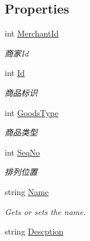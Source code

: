 \subsection*{Properties}
\begin{DoxyCompactItemize}
\item 
int \mbox{\hyperlink{class_t_net_1_1_com_1_1_model_1_1_goods_data_a4df1b04b7bb1e2ab0916e0ff7fbb50e4}{Merchant\+Id}}
\begin{DoxyCompactList}\small\item\em 商家\+Id \end{DoxyCompactList}\item 
int \mbox{\hyperlink{class_t_net_1_1_com_1_1_model_1_1_goods_data_a1f708cd86f42bd5e3b0f470ed530086c}{Id}}
\begin{DoxyCompactList}\small\item\em 商品标识 \end{DoxyCompactList}\item 
int \mbox{\hyperlink{class_t_net_1_1_com_1_1_model_1_1_goods_data_af838d3febefbece02b65ecfb84e613fd}{Goods\+Type}}
\begin{DoxyCompactList}\small\item\em 商品类型 \end{DoxyCompactList}\item 
int \mbox{\hyperlink{class_t_net_1_1_com_1_1_model_1_1_goods_data_aeeabdc6e32e7005c7783a8e04a8c45bb}{Seq\+No}}
\begin{DoxyCompactList}\small\item\em 排列位置 \end{DoxyCompactList}\item 
string \mbox{\hyperlink{class_t_net_1_1_com_1_1_model_1_1_goods_data_a4355e9aac7464bcee7923af35a587859}{Name}}
\begin{DoxyCompactList}\small\item\em Gets or sets the name. \end{DoxyCompactList}\item 
string \mbox{\hyperlink{class_t_net_1_1_com_1_1_model_1_1_goods_data_aaed8f1a70d597cb090a4cfc06197e0c4}{Descption}}

\end{DoxyCompactItemize}
